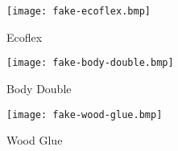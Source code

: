 \begin{minipage}[r]{0.16\textwidth}
    \centering
    \texttt{[image: fake-ecoflex.bmp]}
    \vspace{-10mm}\caption{Ecoflex}
\end{minipage}
\begin{minipage}[r]{0.16\textwidth}
    \centering
    \texttt{[image: fake-body-double.bmp]}
    \vspace{-10mm}\caption{Body Double}
\end{minipage}
\begin{minipage}[r]{0.16\textwidth}
    \centering
    \texttt{[image: fake-wood-glue.bmp]}
    \vspace{-10mm}\caption{Wood Glue}        
\end{minipage}